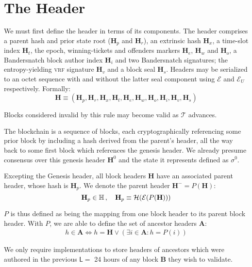 \section{The Header}\label{sec:header}

We must first define the header in terms of its components. The header comprises a parent hash and prior state root ($\mathbf{H}_p$ and $\mathbf{H}_r$), an extrinsic hash $\mathbf{H}_x$, a time-slot index $\mathbf{H}_t$, the epoch, winning-tickets and offenders markers $\mathbf{H}_e$, $\mathbf{H}_w$ and $\mathbf{H}_o$, a Bandersnatch block author index $\mathbf{H}_i$ and two Bandersnatch signatures; the entropy-yielding \textsc{vrf} signature $\mathbf{H}_v$ and a block seal $\mathbf{H}_s$. Headers may be serialized to an octet sequence with and without the latter seal component using $\mathcal{E}$ and $\mathcal{E}_U$ respectively. Formally:
\begin{equation}\label{eq:header}
  \mathbf{H} \equiv (\mathbf{H}_p, \mathbf{H}_r, \mathbf{H}_x, \mathbf{H}_t, \mathbf{H}_e, \mathbf{H}_w, \mathbf{H}_o, \mathbf{H}_i, \mathbf{H}_v, \mathbf{H}_s)
\end{equation}

Blocks considered invalid by this rule may become valid as $\mathcal{T}$ advances.

The blockchain is a sequence of blocks, each cryptographically referencing some prior block by including a hash derived from the parent's header, all the way back to some first block which references the genesis header. We already presume consensus over this genesis header $\mathbf{H}^0$ and the state it represents defined as $\sigma^0$.

Excepting the Genesis header, all block headers $\mathbf{H}$ have an associated parent header, whose hash is $\mathbf{H}_p$. We denote the parent header $\mathbf{H}^- = P(\mathbf{H})$:
\begin{equation}
  \mathbf{H}_p \in \mathbb{H} \,,\quad \mathbf{H}_p \equiv \mathcal{H}(\mathcal{E}(P(\mathbf{H})))
\end{equation}

$P$ is thus defined as being the mapping from one block header to its parent block header. With $P$, we are able to define the set of ancestor headers $\mathbf{A}$:
\begin{align}\label{eq:ancestors}
  h \in \mathbf{A} \Leftrightarrow h = \mathbf{H} \vee (\exists i \in \mathbf{A} : h = P(i))
\end{align}

We only require implementations to store headers of ancestors which were authored in the previous $\mathsf{L} = $ 24 hours of any block $\mathbf{B}$ they wish to validate.

